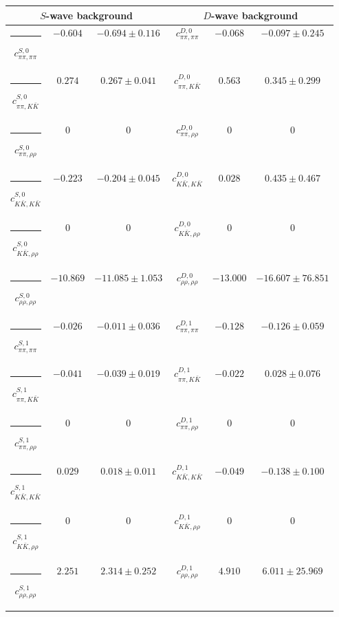 \begin{table}[h]
\begin{ruledtabular}
\begin{tabular}{c c c c c c c c c}
\end{tabular}
\vspace{2em}
\begin{tabular}{c c c c c c}
\multicolumn{3}{c}{$S$-wave background}  & \multicolumn{3}{c}{$D$-wave background} \\ \hline
\rule[-0.2cm]{-0.1cm}{.55cm} $c^{S,0}_{\pi\pi,\pi\pi}$ &$-0.604$ & $-0.694 \pm 0.116$ & $c^{D,0}_{\pi\pi,\pi\pi}$ &$-0.068$ & $-0.097 \pm 0.245$ \\
\rule[-0.2cm]{-0.1cm}{.55cm} $c^{S,0}_{\pi\pi,K\bar K}$ &$0.274$ & $0.267 \pm 0.041$ & $c^{D,0}_{\pi\pi,K\bar K}$ &$0.563$ & $0.345 \pm 0.299$ \\
\rule[-0.2cm]{-0.1cm}{.55cm} $c^{S,0}_{\pi\pi,\rho\rho}$ &$0$ & $0$ & $c^{D,0}_{\pi\pi,\rho\rho}$ &$0$ & $0$ \\
\rule[-0.2cm]{-0.1cm}{.55cm} $c^{S,0}_{K\bar K,K\bar K}$ &$-0.223$ & $-0.204 \pm 0.045$ & $c^{D,0}_{K\bar K,K\bar K}$ &$0.028$ & $0.435 \pm 0.467$ \\
\rule[-0.2cm]{-0.1cm}{.55cm} $c^{S,0}_{K\bar K,\rho\rho}$ &$0$ & $0$ & $c^{D,0}_{K\bar K,\rho\rho}$ &$0$ & $0$ \\
\rule[-0.2cm]{-0.1cm}{.55cm} $c^{S,0}_{\rho\rho,\rho\rho}$ &$-10.869$ & $-11.085 \pm 1.053$ & $c^{D,0}_{\rho\rho,\rho\rho}$ &$-13.000$ & $-16.607 \pm 76.851$ \\
\rule[-0.2cm]{-0.1cm}{.55cm} $c^{S,1}_{\pi\pi,\pi\pi}$ &$-0.026$ & $-0.011 \pm 0.036$ & $c^{D,1}_{\pi\pi,\pi\pi}$ &$-0.128$ & $-0.126 \pm 0.059$ \\
\rule[-0.2cm]{-0.1cm}{.55cm} $c^{S,1}_{\pi\pi,K\bar K}$ &$-0.041$ & $-0.039 \pm 0.019$ & $c^{D,1}_{\pi\pi,K\bar K}$ &$-0.022$ & $0.028 \pm 0.076$ \\
\rule[-0.2cm]{-0.1cm}{.55cm} $c^{S,1}_{\pi\pi,\rho\rho}$ &$0$ & $0$ & $c^{D,1}_{\pi\pi,\rho\rho}$ &$0$ & $0$ \\
\rule[-0.2cm]{-0.1cm}{.55cm} $c^{S,1}_{K\bar K,K\bar K}$ &$0.029$ & $0.018 \pm 0.011$ & $c^{D,1}_{K\bar K,K\bar K}$ &$-0.049$ & $-0.138 \pm 0.100$ \\
\rule[-0.2cm]{-0.1cm}{.55cm} $c^{S,1}_{K\bar K,\rho\rho}$ &$0$ & $0$ & $c^{D,1}_{K\bar K,\rho\rho}$ &$0$ & $0$ \\
\rule[-0.2cm]{-0.1cm}{.55cm} $c^{S,1}_{\rho\rho,\rho\rho}$ &$2.251$ & $2.314 \pm 0.252$ & $c^{D,1}_{\rho\rho,\rho\rho}$ &$4.910$ & $6.011 \pm 25.969$ \\
\end{tabular}
\end{ruledtabular}
\end{table}
